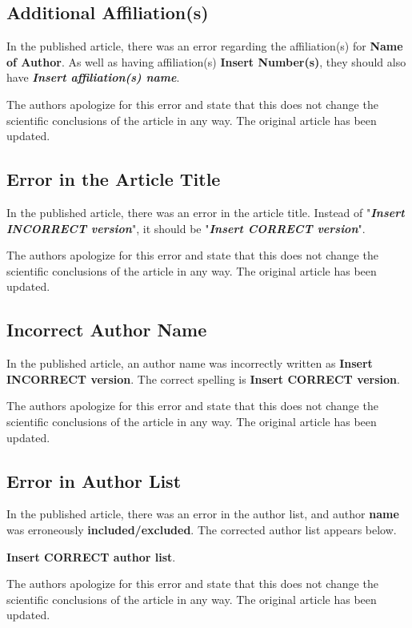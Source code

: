 \documentclass[utf8]{frontiers_correction}
\begin{document}
\vspace{5mm}
\subsection*{Additional Affiliation(s)}
In the published article, there was an error regarding the affiliation(s) for \textbf{Name of Author}. As well as having affiliation(s) \textbf{Insert Number(s)}, they should also have \textbf{\textit{Insert affiliation(s) name}}.\par The authors apologize for this error and state that this does not change the scientific conclusions of the article in any way. The original article has been updated.


\vspace{5mm}
\subsection*{Error in the Article Title}
In the published article, there was an error in the article title. Instead of "\textbf{\textit{Insert INCORRECT version}}", it should be "\textbf{\textit{Insert CORRECT version}}".\par The authors apologize for this error and state that this does not change the scientific conclusions of the article in any way. The original article has been updated.


\vspace{5mm}
\subsection*{Incorrect Author Name}
In the published article, an author name was incorrectly written as \textbf{Insert INCORRECT version}. The correct spelling is \textbf{Insert CORRECT version}.\par The authors apologize for this error and state that this does not change the scientific conclusions of the article in any way. The original article has been updated.


\vspace{5mm}
\subsection*{Error in Author List}
In the published article, there was an error in the author list, and author \textbf{name} was erroneously \textbf{included/excluded}. The corrected author list appears below.\par
\textbf{Insert CORRECT author list}.\par
The authors apologize for this error and state that this does not change the scientific conclusions of the article in any way. The original article has been updated.
\end{document}
